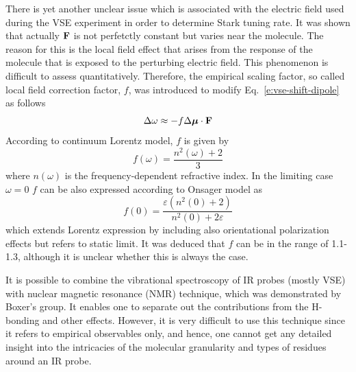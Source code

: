 \documentclass[a4paper,titlepage,twoside,fleqn,12pt]{book}
\newcommand{\BM}[1]{\bm{#1}}
\begin{document}
\begin{refsection}
There is yet another unclear issue which is associated with the electric field
used during the VSE experiment in order to determine Stark tuning rate.
It was shown that actually ${\bf F}$ is not perfetctly constant but varies
near the molecule. The reason for this is the local field effect that arises
from the response of the molecule that is exposed to the perturbing electric field.
This phenomenon is difficult to assess quantitatively. Therefore, 
the empirical scaling factor, so called local field correction factor, $f$, 
was introduced to modify Eq.~\eqref{e:vse-shift-dipole} as follows
%
\begin{equation} \label{e:vse-shift-dipole-corr}
 \Delta \omega \approx - f \Delta {\BM \mu} \cdot {\bf F}
\end{equation}
%
According to continuum Lorentz model, $f$ is given by\citep{Wortmann.Bishop.JCP.1998}
%
\begin{equation}
f(\omega) = \frac{n^2(\omega)+2}{3}
\end{equation}
%
where $n(\omega)$ is the frequency\hyp{}dependent refractive index.
In the limiting case $\omega=0$ $f$ can be also expressed according to Onsager
model as\citep{Wortmann.Bishop.JCP.1998}
%
\begin{equation}
f(0) = \frac{\varepsilon (n^2(0)+2)}{n^2(0)+2\varepsilon}
\end{equation}
%
which extends Lorentz expression by including also orientational polarization effects
but refers to static limit.
It was deduced that $f$ can be in the range of 1.1-1.3\citep{Wortmann.Bishop.JCP.1998,
Bublitz.Boxer.AnnuRevPhysChem.1997}, although
it is unclear whether this is always the case.

It is possible to combine the vibrational spectroscopy of IR probes (mostly VSE) with nuclear magnetic 
resonance (NMR) technique, which was demonstrated by Boxer's 
group.\citep{Fafarman.Sigala.Herschlag.Boxer.JACS.2010,Bagchi.Fried.Boxer.JACS.2012} 
It enables one
to separate out the contributions from the H\hyp{}bonding and other effects. However, 
it is very difficult to use this technique since it refers to empirical observables only,
and hence, one cannot get any detailed insight into the intricacies of the molecular granularity
and types of residues around an IR probe.


\end{refsection}
\end{document}
